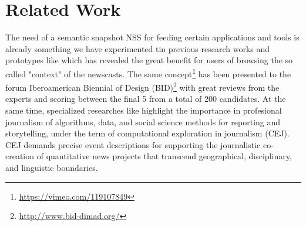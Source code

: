\documentclass{llncs}
\newcommand{\todo}[1]{\colorbox{red}{#1}}
\begin{document}



\section{Related Work}
\label{sec:RelatedWork}


The need of a semantic snapshot NSS for feeding certain applications and tools is already something we have experimented tin previous research works and prototypes like\cite{Redondo2014} which has revealed the great benefit for users of browsing the so called "context" of the newscasts. The same concept\footnote{\fontsize{8pt}{1em}\selectfont \url{https://vimeo.com/119107849}} has been presented to the forum Iberoamerican Biennial of Design (BID)\footnote{\fontsize{8pt}{1em}\selectfont \url{http://www.bid-dimad.org/}} with great reviews from the experts and scoring between the final 5 from a total of 200 candidates. At the same time, specialized researches like\cite{gynnild2014} highlight the importance in profesional journalism of algorithms, data, and social science methods for reporting and storytelling, under the term of computational exploration in journalism (CEJ). CEJ demands precise event descriptions for supporting the journalistic co-creation of quantitative news projects that transcend geographical, disciplinary, and linguistic boundaries.
\end{document}
